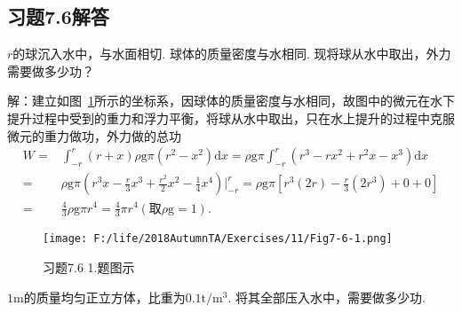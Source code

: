 \documentclass[12pt,UTF8]{ctexart}
\begin{document}
\subsection{习题7.6解答}
\begin{enumerate}
$r$的球沉入水中，与水面相切. 球体的质量密度与水相同. 现将球从水中取出，外力需要做多少功？

解：建立如图~\ref{7-6-1}所示的坐标系，因球体的质量密度与水相同，故图中的微元在水下提升过程中受到的重力和浮力平衡，将球从水中取出，只在水上提升的过程中克服微元的重力做功，外力做的总功
\[\begin{split}
W=&\int_{-r}^r(r+x)\rho\mathrm g\pi(r^2-x^2)\mathrm dx=\rho\mathrm g\pi\int_{-r}^r(r^3-rx^2+r^2x-x^3)\mathrm dx\\
=&\rho\mathrm g\pi(r^3x-\frac r3x^3+\frac{r^2}2x^2-\frac14x^4)\Big|_{-r}^r=\rho\mathrm g\pi[r^3(2r)-\frac r3(2r^3)+0+0]\\
=&\frac43\rho\mathrm g\pi r^4=\frac43\pi r^4(\text{取}\rho\mathrm g=1).
\end{split}\]

\begin{figure}[H]
\begin{center}
\texttt{[image: F:/life/2018AutumnTA/Exercises/11/Fig7-6-1.png]}
\end{center}
\caption{习题7.6 1.题图示}
\label{7-6-1}
\end{figure}
$1\mathrm m$的质量均匀正立方体，比重为$0.1\mathrm{t/m^3}$. 将其全部压入水中，需要做多少功.


\end{enumerate}
\end{document}
